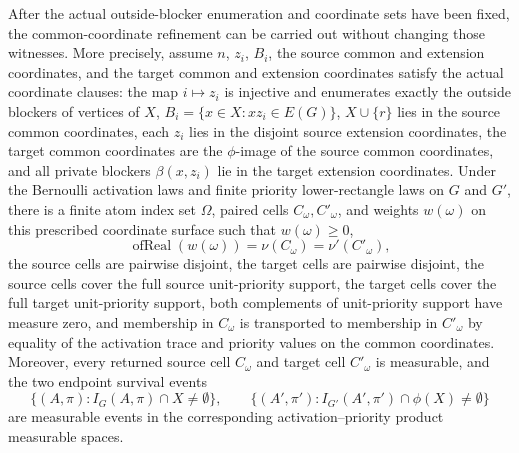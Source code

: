 \begin{helper}
After the actual outside-blocker enumeration and coordinate sets have been
fixed, the common-coordinate refinement can be carried out without changing
those witnesses.  More precisely, assume \(n\), \(z_i\), \(B_i\), the source
common and extension coordinates, and the target common and extension
coordinates satisfy the actual coordinate clauses: the map \(i\mapsto z_i\)
is injective and enumerates exactly the outside blockers of vertices of
\(X\), \(B_i=\{x\in X:xz_i\in E(G)\}\), \(X\cup\{r\}\) lies in the source
common coordinates, each \(z_i\) lies in the disjoint source extension
coordinates, the target common coordinates are the \(\phi\)-image of the
source common coordinates, and all private blockers \(\beta(x,z_i)\) lie in
the target extension coordinates.
Under the Bernoulli activation laws and finite priority lower-rectangle laws
on \(G\) and \(G'\), there is a finite atom index set \(\Omega\), paired cells
\(C_\omega,C'_\omega\), and weights \(w(\omega)\) on this prescribed
coordinate surface such that \(w(\omega)\ge0\),
\[
  \operatorname{ofReal}(w(\omega))=\nu(C_\omega)
  =\nu'(C'_\omega),
\]
the source cells are pairwise disjoint, the target cells are pairwise
disjoint, the source cells cover the full source unit-priority support, the
target cells cover the full target unit-priority support, both complements of
unit-priority support have measure zero, and membership in \(C_\omega\) is
transported to membership in \(C'_\omega\) by equality of the activation trace
and priority values on the common coordinates.  Moreover, every returned
source cell \(C_\omega\) and target cell \(C'_\omega\) is measurable, and the
two endpoint survival events
\[
  \{(A,\pi): I_G(A,\pi)\cap X\ne\emptyset\},\qquad
  \{(A',\pi'): I_{G'}(A',\pi')\cap \phi(X)\ne\emptyset\}
\]
are measurable events in the corresponding activation--priority product
measurable spaces.
\end{helper}
